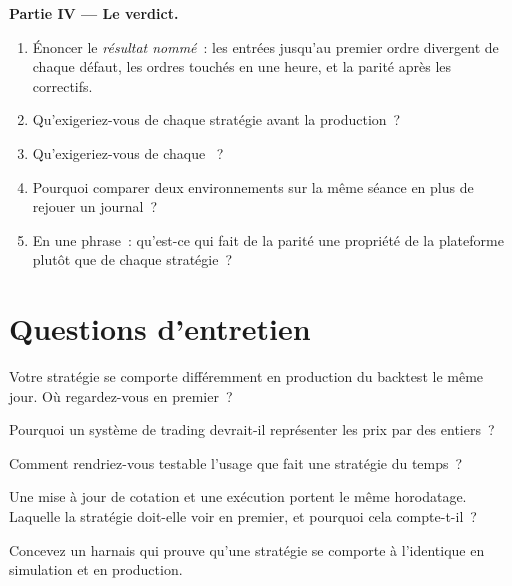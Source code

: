 \begin{problem}
\medskip\noindent\textbf{Partie IV --- Le verdict.}
\begin{enumerate}[resume]
\item Énoncer le \emph{résultat nommé}~: les entrées jusqu'au premier ordre divergent de chaque défaut, les ordres touchés en une heure, et la
parité après les correctifs.
\item Qu'exigeriez-vous de chaque stratégie avant la production~?
\item Qu'exigeriez-vous de chaque ~?
\item Pourquoi comparer deux environnements sur la même séance en plus de rejouer un journal~?
\item En une phrase~: qu'est-ce qui fait de la parité une propriété de la plateforme plutôt que de chaque stratégie~?
\end{enumerate}
\end{problem}

\section{Questions d'entretien}

\begin{interviewq}\label{iq:pl:simulation-production-parity:1}
Votre stratégie se comporte différemment en production du backtest le même jour. Où regardez-vous en premier~?
\end{interviewq}

\begin{interviewq}\label{iq:pl:simulation-production-parity:2}
Pourquoi un système de trading devrait-il représenter les prix par des entiers~?
\end{interviewq}

\begin{interviewq}\label{iq:pl:simulation-production-parity:3}
Comment rendriez-vous testable l'usage que fait une stratégie du temps~?
\end{interviewq}

\begin{interviewq}\label{iq:pl:simulation-production-parity:4}
Une mise à jour de cotation et une exécution portent le même horodatage. Laquelle la stratégie doit-elle voir en premier, et pourquoi cela compte-t-il~?
\end{interviewq}

\begin{interviewq}\label{iq:pl:simulation-production-parity:5}
Concevez un harnais qui prouve qu'une stratégie se comporte à l'identique en simulation et en production.
\end{interviewq}
